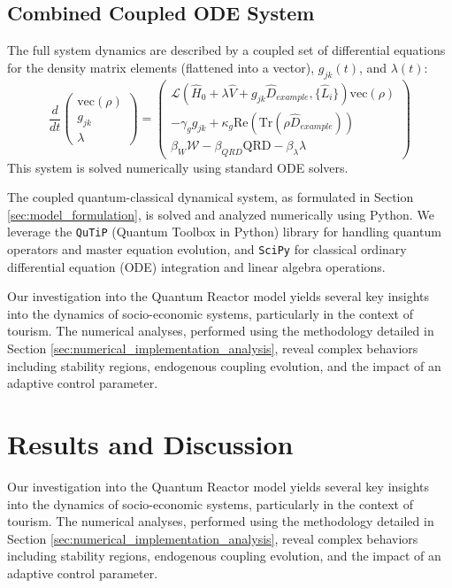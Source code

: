 \documentclass[9pt]{article}
\begin{document}
\subsection{Combined Coupled ODE System}
The full system dynamics are described by a coupled set of differential equations for the density matrix elements (flattened into a vector), $g_{jk}(t)$, and $\lambda(t)$:
$$ \frac{d}{dt} \begin{pmatrix} \text{vec}(\rho) \\ g_{jk} \\ \lambda \end{pmatrix} = \begin{pmatrix} \mathcal{L}(\hat{H}_0 + \lambda \hat{V} + g_{jk} \hat{D}_{example}, \{\hat{L}_i\}) \text{vec}(\rho) \\ -\gamma_g g_{jk} + \kappa_g \text{Re}(\text{Tr}(\rho \hat{D}_{example})) \\ \beta_W \mathcal{W} - \beta_{QRD} \text{QRD} - \beta_\lambda \lambda \end{pmatrix} $$
This system is solved numerically using standard ODE solvers.

The coupled quantum-classical dynamical system, as formulated in Section \ref{sec:model_formulation}, is solved and analyzed numerically using Python. We leverage the \texttt{QuTiP} (Quantum Toolbox in Python) library for handling quantum operators and master equation evolution, and \texttt{SciPy} for classical ordinary differential equation (ODE) integration and linear algebra operations.

Our investigation into the Quantum Reactor model yields several key insights into the dynamics of socio-economic systems, particularly in the context of tourism. The numerical analyses, performed using the methodology detailed in Section \ref{sec:numerical_implementation_analysis}, reveal complex behaviors including stability regions, endogenous coupling evolution, and the impact of an adaptive control parameter.

\section{Results and Discussion}
Our investigation into the Quantum Reactor model yields several key insights into the dynamics of socio-economic systems, particularly in the context of tourism. The numerical analyses, performed using the methodology detailed in Section \ref{sec:numerical_implementation_analysis}, reveal complex behaviors including stability regions, endogenous coupling evolution, and the impact of an adaptive control parameter.
\end{document}
